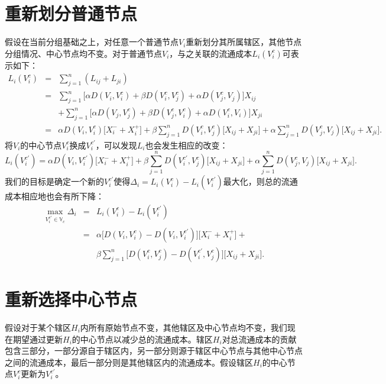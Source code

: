\section{重新划分普通节点}
假设在当前分组基础之上，对任意一个普通节点$V_i$重新划分其所属辖区，其他节点分组情况、中心节点均不变。对于普通节点$V_i$，与之关联的流通成本$L_i(V_i^c)$可表示如下：
\begin{equation}
    \begin{array}{lll}
        L_i(V_i^c) & = & \sum\limits_{j=1}^n (L_{ij} + L_{ji})\\
        & = & \sum\limits_{j=1}^n \big[\alpha D(V_i, V_i^c) + \beta D(V_i^c, V_j^c) + \alpha D(V_j^c, V_j) \big] X_{ij} \\
        && + \sum\limits_{j=1}^n \big[\alpha D(V_j, V_j^c) + \beta D(V_j^c, V_i^c) + \alpha D(V_i^c, V_i) \big] X_{ji}\\
        & = & \alpha D(V_i, V_i^c) \big[X_i^{-} + X_i^{+}\big] + \beta \sum\limits_{j=1}^n D(V_i^c, V_j^c) \big[X_{ij} + X_{ji} \big] + \alpha \sum\limits_{j=1}^n D(V_j^c, V_j)\big[ X_{ij} + X_{ji}\big].
    \end{array}
\end{equation}
将$V_i$的中心节点$V_i^c$换成$V_i^{c'}$，可以发现$L_i$也会发生相应的改变：
\begin{equation}
        L_i(V_i^{c'})  = \alpha D(V_i, V_i^{c'}) \big[X_i^{-} + X_i^{+}\big] + \beta \sum\limits_{j=1}^n D(V_i^{c'}, V_j^c) \big[X_{ij} + X_{ji} \big] + \alpha \sum\limits_{j=1}^n D(V_j^c, V_j)\big[X_{ij} + X_{ji}\big].
\end{equation}
我们的目标是确定一个新的$V_i^{c'}$使得$\Delta_i = L_i(V_i^c) - L_i(V_i^{c'})$最大化，则总的流通成本相应地也会有所下降：
\begin{equation}
    \begin{array}{lll}
    \max\limits_{V_i^{c'}\in \mathbb V_c} \Delta_i  & = & L_i(V_i^c) - L_i(V_i^{c'}) \\
    & = & \alpha \big[D(V_i, V_i^c) - D(V_i, V_i^{c'})\big] \big[X_i^{-} + X_i^{+}\big] + \\
    && \beta \sum\limits_{j=1}^n \big[D(V_i^c, V_j^c)-D(V_i^{c'}, V_j^c)\big] \big[X_{ij} + X_{ji} \big].
    \end{array}
\end{equation}

\section{重新选择中心节点}
假设对于某个辖区$H_i$内所有原始节点不变，其他辖区及中心节点均不变，我们现在期望通过更新$H_i$的中心节点以减少总的流通成本。辖区$H_i$对总流通成本的贡献包含三部分，一部分源自于辖区内，另一部分则源于辖区中心节点与其他中心节点之间的流通成本，最后一部分则是其他辖区内的流通成本。假设辖区$H_i$的中心节点$V_i^c$更新为$V_i^{c'}$。

